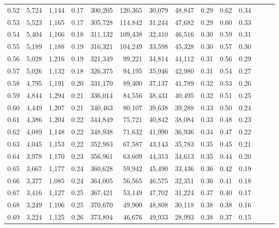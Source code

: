 \begin{tabular}{rrrrrrrrrrrrrr}
0.52 &   5,724 &  1,144 &  0.17 &  300,205 &  120,365 &  30,079 &  48,847 &  0.29 &  0.62 &      0.34 \\
0.53 &   5,523 &  1,165 &  0.17 &  305,728 &  114,842 &  31,244 &  47,682 &  0.29 &  0.60 &      0.33 \\
0.54 &   5,404 &  1,166 &  0.18 &  311,132 &  109,438 &  32,410 &  46,516 &  0.30 &  0.59 &      0.31 \\
0.55 &   5,189 &  1,188 &  0.19 &  316,321 &  104,249 &  33,598 &  45,328 &  0.30 &  0.57 &      0.30 \\
0.56 &   5,028 &  1,216 &  0.19 &  321,349 &   99,221 &  34,814 &  44,112 &  0.31 &  0.56 &      0.29 \\
0.57 &   5,026 &  1,132 &  0.18 &  326,375 &   94,195 &  35,946 &  42,980 &  0.31 &  0.54 &      0.27 \\
0.58 &   4,795 &  1,191 &  0.20 &  331,170 &   89,400 &  37,137 &  41,789 &  0.32 &  0.53 &      0.26 \\
0.59 &   4,844 &  1,294 &  0.21 &  336,014 &   84,556 &  38,431 &  40,495 &  0.32 &  0.51 &      0.25 \\
0.60 &   4,449 &  1,207 &  0.21 &  340,463 &   80,107 &  39,638 &  39,288 &  0.33 &  0.50 &      0.24 \\
0.61 &   4,386 &  1,204 &  0.22 &  344,849 &   75,721 &  40,842 &  38,084 &  0.33 &  0.48 &      0.23 \\
0.62 &   4,089 &  1,148 &  0.22 &  348,938 &   71,632 &  41,990 &  36,936 &  0.34 &  0.47 &      0.22 \\
0.63 &   4,045 &  1,153 &  0.22 &  352,983 &   67,587 &  43,143 &  35,783 &  0.35 &  0.45 &      0.21 \\
0.64 &   3,978 &  1,170 &  0.23 &  356,961 &   63,609 &  44,313 &  34,613 &  0.35 &  0.44 &      0.20 \\
0.65 &   3,667 &  1,177 &  0.24 &  360,628 &   59,942 &  45,490 &  33,436 &  0.36 &  0.42 &      0.19 \\
0.66 &   3,377 &  1,085 &  0.24 &  364,005 &   56,565 &  46,575 &  32,351 &  0.36 &  0.41 &      0.18 \\
0.67 &   3,416 &  1,127 &  0.25 &  367,421 &   53,149 &  47,702 &  31,224 &  0.37 &  0.40 &      0.17 \\
0.68 &   3,249 &  1,106 &  0.25 &  370,670 &   49,900 &  48,808 &  30,118 &  0.38 &  0.38 &      0.16 \\
0.69 &   3,224 &  1,125 &  0.26 &  373,894 &   46,676 &  49,933 &  28,993 &  0.38 &  0.37 &      0.15 \\

\end{tabular}
